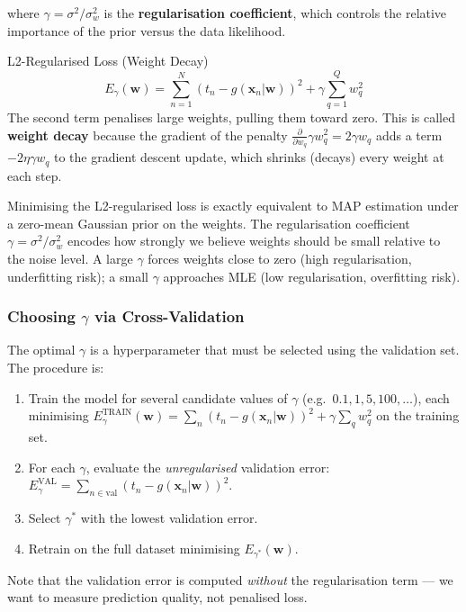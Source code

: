 \documentclass[11pt,a4paper]{article}
\newcommand{\term}[1]{\textcolor{DefGreen}{\textbf{#1}}}
\begin{document}
where $\gamma = \sigma^2 / \sigma_w^2$ is the \term{regularisation coefficient}, which controls the relative importance of the prior versus the data likelihood.

\begin{defbox}{L2-Regularised Loss (Weight Decay)}
\[
E_\gamma(\mathbf{w}) = \sum_{n=1}^N (t_n - g(\mathbf{x}_n|\mathbf{w}))^2 + \gamma \sum_{q=1}^Q w_q^2
\]
The second term penalises large weights, pulling them toward zero. This is called \term{weight decay} because the gradient of the penalty $\frac{\partial}{\partial w_q}\gamma w_q^2 = 2\gamma w_q$ adds a term $-2\eta\gamma w_q$ to the gradient descent update, which shrinks (decays) every weight at each step.
\end{defbox}

\begin{insightbox}[Weight Decay = MAP under Gaussian prior]
Minimising the L2-regularised loss is exactly equivalent to MAP estimation under a zero-mean Gaussian prior on the weights. The regularisation coefficient $\gamma = \sigma^2/\sigma_w^2$ encodes how strongly we believe weights should be small relative to the noise level. A large $\gamma$ forces weights close to zero (high regularisation, underfitting risk); a small $\gamma$ approaches MLE (low regularisation, overfitting risk).
\end{insightbox}

\subsubsection{Choosing $\gamma$ via Cross-Validation}

The optimal $\gamma$ is a hyperparameter that must be selected using the validation set. The procedure is:
\begin{enumerate}
  \item Train the model for several candidate values of $\gamma$ (e.g.\ $0.1, 1, 5, 100, \ldots$), each minimising $E_\gamma^{\mathrm{TRAIN}}(\mathbf{w}) = \sum_n (t_n - g(\mathbf{x}_n|\mathbf{w}))^2 + \gamma \sum_q w_q^2$ on the training set.
  \item For each $\gamma$, evaluate the \emph{unregularised} validation error: $E_\gamma^{\mathrm{VAL}} = \sum_{n \in \mathrm{val}} (t_n - g(\mathbf{x}_n|\mathbf{w}))^2$.
  \item Select $\gamma^*$ with the lowest validation error.
  \item Retrain on the full dataset minimising $E_{\gamma^*}(\mathbf{w})$.
\end{enumerate}
Note that the validation error is computed \emph{without} the regularisation term — we want to measure prediction quality, not penalised loss.
\end{document}
